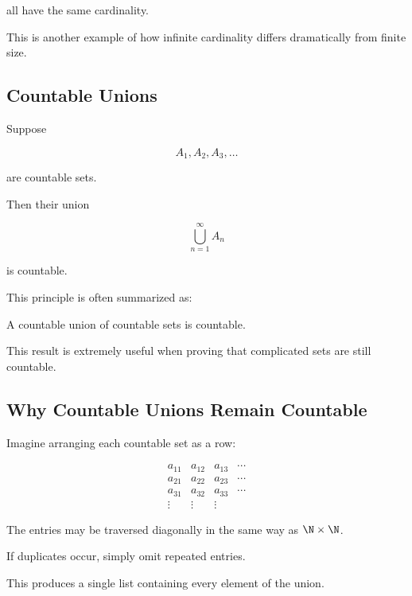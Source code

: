 all have the same cardinality.

This is another example of how infinite cardinality differs dramatically from
finite size.

\subsection{Countable Unions}
\label{subsec:countable-unions}

Suppose

\[ A_1,A_2,A_3,\ldots \]

are countable sets.

Then their union

\[ \bigcup_{n=1}^{\infty}A_n \]

is countable.

This principle is often summarized as:

\begin{importantbox}
A countable union of countable sets is countable.
\end{importantbox}

This result is extremely useful when proving that complicated sets are still
countable.

\subsection{Why Countable Unions Remain Countable}
\label{subsec:why-countable-unions}

Imagine arranging each countable set as a row:

\[
\begin{array}{cccc}
a_{11}&a_{12}&a_{13}&\cdots\\
a_{21}&a_{22}&a_{23}&\cdots\\
a_{31}&a_{32}&a_{33}&\cdots\\
\vdots&\vdots&\vdots&
\end{array}
\]

The entries may be traversed diagonally in the same way as
\(\N\times\N\).

If duplicates occur, simply omit repeated entries.

This produces a single list containing every element of the union.

